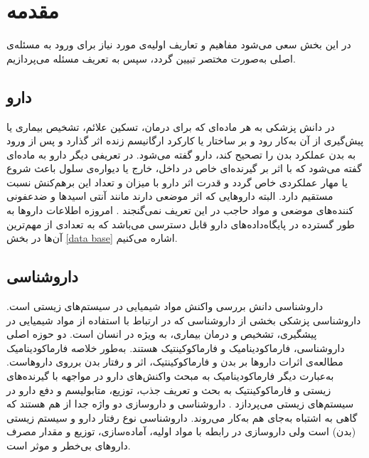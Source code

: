 
\chapter{مقدمه}



در این بخش سعی می‌شود مفاهیم و تعاریف اولیه‌ی مورد نیاز برای ورود به مسئله‌ی اصلی به‌صورت مختصر تبیین گردد، سپس به تعریف مسئله می‌پردازیم.

\section{دارو}
در دانش پزشکی به هر ماده‌ای که برای درمان، تسکین علائم، تشخیص بیماری یا پیش‌گیری از آن به‌کار رود و بر ساختار یا کارکرد ارگانیسم زنده اثر گذارد و پس از ورود به بدن عملکرد بدن را تصحیح کند، دارو 
گفته می‌شود. در تعریفی دیگر دارو به ماده‌ای گفته می‌شود که با اثر بر گیرنده‌ای خاص در داخل، خارج یا دیواره‌ی سلول باعث شروع یا مهار عملکردی خاص ‌گردد و قدرت اثر دارو با میزان و تعداد این برهم‌کنش نسبت مستقیم دارد. البته داروهایی که  اثر موضعی دارند مانند آنتی اسیدها و ضدعفونی کننده‌های موضعی و مواد حاجب در این تعریف نمی‌گنجند 
\cite{Basic2018}.
امروزه اطلاعات دارو‌ها به طور گسترده در پایگاه‌داده‌های دارو قابل دسترسی می‌باشد که به تعدادی از مهم‌ترین آن‌ها در بخش
\ref{data base} 
اشاره می‌کنیم.
 
\section{داروشناسی}
داروشناسی
دانش بررسی واکنش مواد شیمیایی در سیستم‌های زیستی است. داروشناسی پزشکی
بخشی از داروشناسی که در ارتباط با استفاده از مواد شیمیایی در پیشگیری، تشخیص و درمان بیماری، به ویژه در انسان است. دو حوزه اصلی داروشناسی، فارماکودینامیک 
و فارماکوکینتیک
هستند. به‌طور خلاصه فارماکودینامیک مطالعه‌ی اثرات داروها بر بدن و فارماکوکینتیک، اثر و رفتار بدن برروی داروهاست. به‌عبارت دیگر فارماکودینامیک به مبحث واکنش‌های دارو در مواجهه با گیرنده‌های زیستی و فارماکوکینتیک به بحث و تعریف جذب، توزیع، متابولیسم و دفع دارو در سیستم‌های زیستی می‌پردازد
\cite{katzung2019katzung}.
داروشناسی و داروسازی
دو واژه جدا از هم هستند که گاهی به ‌اشتباه به‌جای هم به‌کار می‌روند. داروشناسی نوع رفتار دارو و سیستم‌ زیستی (بدن) است ولی داروسازی در رابطه با مواد اولیه، آماده‌سازی، توزیع و مقدار
مصرف داروهای بی‌خطر و موثر است.
